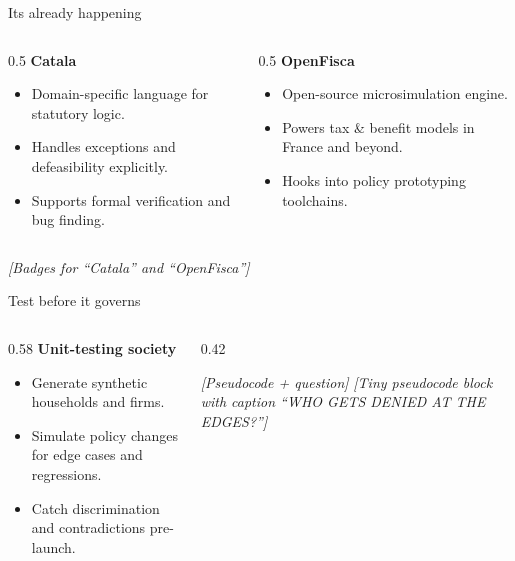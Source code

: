 \documentclass[10pt, aspectratio=169]{beamer}
\newcommand{\placeholder}[1]{\textit{[#1]}}
\begin{document}
\begin{frame}{It\textquotesingle s already happening}
  \begin{columns}[T]
    \begin{column}{0.5\textwidth}
      \textbf{Catala}
      \begin{itemize}
        \item Domain-specific language for statutory logic.
        \item Handles exceptions and defeasibility explicitly.
        \item Supports formal verification and bug finding.
      \end{itemize}
    \end{column}
    \begin{column}{0.5\textwidth}
      \textbf{OpenFisca}
      \begin{itemize}
        \item Open-source microsimulation engine.
        \item Powers tax \& benefit models in France and beyond.
        \item Hooks into policy prototyping toolchains.
      \end{itemize}
    \end{column}
  \end{columns}
  \vfill
  \begin{center}
    \placeholder{Badges for ``Catala'' and ``OpenFisca''}
  \end{center}
  \small \parencite{catala,openfisca,openfisca_docs}
\end{frame}

\begin{frame}{Test before it governs}
  \begin{columns}[T]
    \begin{column}{0.58\textwidth}
      \textbf{Unit-testing society}
      \begin{itemize}
        \item Generate synthetic households and firms.
        \item Simulate policy changes for edge cases and regressions.
        \item Catch discrimination and contradictions pre-launch.
      \end{itemize}
    \end{column}
    \begin{column}{0.42\textwidth}
      \begin{block}{\placeholder{Pseudocode + question}}
        \centering
        \placeholder{Tiny pseudocode block with caption ``WHO GETS DENIED AT THE EDGES?''}
      \end{block}
    \end{column}
  \end{columns}
  \vfill
  \small \parencite{cutecat}
\end{frame}
\end{document}
